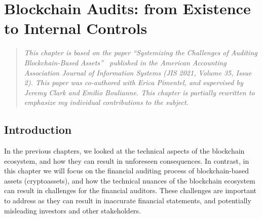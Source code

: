 \chapter{Blockchain Audits: from Existence to Internal Controls} \label{sec:auditing} 








\begin{quote}
	\textit{This chapter is based on the paper ``Systemizing the Challenges of Auditing Blockchain-Based Assets''~\cite{pimentel2021systemizing} published in the American Accounting Association Journal of Information Systems (JIS 2021, Volume 35, Issue 2). This paper was co-authored with Erica Pimentel, and supervised by Jeremy Clark and Emilio Boulianne. This chapter is partially rewritten to emphasize my individual contributions to the subject.}
\end{quote}



\section{Introduction} \label{sec:auditing:intro}

In the previous chapters, we looked at the technical aspects of the blockchain ecosystem, and how they can result in unforeseen consequences. In contrast, in this chapter we will focus on the financial auditing process of blockchain-based assets (cryptoassets), and how the technical nuances of the blockchain ecosystem can result in challenges for the financial auditors. These challenges are important to address as they can result in inaccurate financial statements, and potentially misleading investors and other stakeholders.

